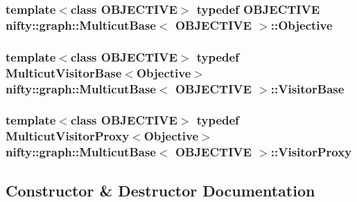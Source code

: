 \subsubsection[{Objective}]{\setlength{\rightskip}{0pt plus 5cm}template$<$class O\+B\+J\+E\+C\+T\+I\+V\+E$>$ typedef O\+B\+J\+E\+C\+T\+I\+V\+E {\bf nifty\+::graph\+::\+Multicut\+Base}$<$ O\+B\+J\+E\+C\+T\+I\+V\+E $>$\+::{\bf Objective}}\label{classnifty_1_1graph_1_1MulticutBase_a7d014a4aa2d6e8fa3cd58b70b95ca829}
\hypertarget{classnifty_1_1graph_1_1MulticutBase_a5882fb69df59d8113f6a81a0dac26eaa}{}
\subsubsection[{Visitor\+Base}]{\setlength{\rightskip}{0pt plus 5cm}template$<$class O\+B\+J\+E\+C\+T\+I\+V\+E$>$ typedef {\bf Multicut\+Visitor\+Base}$<${\bf Objective}$>$ {\bf nifty\+::graph\+::\+Multicut\+Base}$<$ O\+B\+J\+E\+C\+T\+I\+V\+E $>$\+::{\bf Visitor\+Base}}\label{classnifty_1_1graph_1_1MulticutBase_a5882fb69df59d8113f6a81a0dac26eaa}
\hypertarget{classnifty_1_1graph_1_1MulticutBase_a6ede271a3cb0ae4711a7e9da2b07efa9}{}
\subsubsection[{Visitor\+Proxy}]{\setlength{\rightskip}{0pt plus 5cm}template$<$class O\+B\+J\+E\+C\+T\+I\+V\+E$>$ typedef {\bf Multicut\+Visitor\+Proxy}$<${\bf Objective}$>$ {\bf nifty\+::graph\+::\+Multicut\+Base}$<$ O\+B\+J\+E\+C\+T\+I\+V\+E $>$\+::{\bf Visitor\+Proxy}}\label{classnifty_1_1graph_1_1MulticutBase_a6ede271a3cb0ae4711a7e9da2b07efa9}


\subsection{Constructor \& Destructor Documentation}
\hypertarget{classnifty_1_1graph_1_1MulticutBase_aeeb6d7ebf88061a676f07025944aa403}{}
